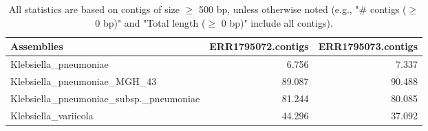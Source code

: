 \documentclass[12pt,a4paper]{article}
\begin{document}
\begin{table}[ht]
\begin{center}
\caption{All statistics are based on contigs of size $\geq$ 500 bp, unless otherwise noted (e.g., "\# contigs ($\geq$ 0 bp)" and "Total length ($\geq$ 0 bp)" include all contigs).}
\begin{tabular}{|l*{2}{|r}|}
\hline
Assemblies & ERR1795072.contigs & ERR1795073.contigs \\ \hline
Klebsiella\_pneumoniae & 6.756 & 7.337 \\ \hline
Klebsiella\_pneumoniae\_MGH\_43 & 89.087 & 90.488 \\ \hline
Klebsiella\_pneumoniae\_subsp.\_pneumoniae & 81.244 & 80.085 \\ \hline
Klebsiella\_variicola & 44.296 & 37.092 \\ \hline
\end{tabular}
\end{center}
\end{table}
\end{document}
